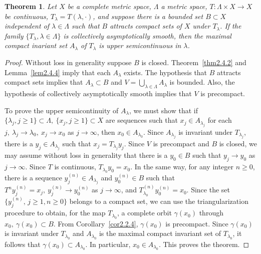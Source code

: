 \documentclass{surv-l}
\theoremstyle{plain}
\newtheorem{theorem}{Theorem}[section]
\theoremstyle{definition}
\numberwithin{equation}{section}
\numberwithin{figure}{chapter}
\begin{document}
\begin{theorem}\label{thm2.5.2} Let $X$ be a complete metric space, $\Lambda$ a metric space,
$T\!:\Lambda \times X\rightarrow X$ be continuous, $T_{\lambda}=T(\lambda, \cdot)$, and suppose there is a bounded set $B\subset X$ independent of $\lambda\in\Lambda$ such that $B$ attracts compact sets of $X$ under $T_{\lambda}$. If the family $\{T_{\lambda}, \lambda\in\Lambda\}$ is collectively asymptotically smooth, then the maximal compact inariant set $A_{\lambda}$ of $T_{\lambda}$ is upper semicontinuous in $\lambda$.
\end{theorem}

\begin{proof} Without loss in generality suppose $B$ is closed. Theorem~\ref{thm2.4.2} and Lemma~\ref{lem2.4.4} imply that each $A_{\lambda}$ exists. The hypothesis that $B$ attracts compact sets implies that $A_{\lambda}\subset B$ and $V=\bigcup_{\lambda\in\Lambda}A_{\lambda}$ is bounded. Also, the hypothesis of collectively asymptotically smooth implies that $V$ is precompact.

To prove the upper semicontinuity of $A_{\lambda}$, we must show that if $\{\lambda_{j}, j\geq 1\}\subset \Lambda,\ \{x_{j},j\geq 1\}\subset X$ are sequences such that $x_{j}\in A_{\lambda_{j}}$ for each $j,\ \lambda_{j}\rightarrow\lambda_{0},\ x_{j}\rightarrow x_{0}$ as $j\rightarrow\infty$, then $x_{0}\in A_{\lambda_{0}}$. Since $A_{\lambda_{j}}$ is invariant under $T_{\lambda_{j}}$, there is a $y_{j}\in A_{\lambda_{j}}$ such that $x_{j}=T_{\lambda_{j}}y_{j}$. Since $V$ is precompact and $B$ is closed, we may assume without loss in generality that there is a $y_{0}\in B$ such that $y_{j}\rightarrow y_{0}$ as $j\rightarrow\infty$. Since $T$ is continuous, $T_{\lambda_{0}}y_{0}=x_{0}$. In the same way, for any integer $n\geq 0$, there is a sequence $y_{j}^{(n)}\in A_{\lambda_{j}}$ and $y_{0}^{(n)}\in B$ such that $T^{n}y_{j}^{(n)}=x_{j},\ y_{j}^{(n)}\rightarrow y_{0}^{(n)}$ as $j\rightarrow\infty$, and $T_{\lambda_{0}}^{(n)}y_{0}^{(n)}=x_{0}$. Since the set $\{y_{j}^{(n)},\, j\geq 1, n\geq 0\}$ belongs to a compact set, we can use the triangularization procedure to obtain, for the map $T_{\lambda_{0}}$, a complete orbit $\gamma(x_{0})$ through $x_{0},\ \gamma(x_{0})\subset B$. From Corollary~\ref{cor2.2.4}, $\gamma(x_{0})$ is precompact. Since $\gamma(x_{0})$ is invariant under $T_{\lambda_{0}}$ and $A_{\lambda_{0}}$ is the maximal compact invariant set of $T_{\lambda_{0}}$, it follows that $\gamma(x_{0})\subset A_{\lambda_{0}}$. In particular, $x_{0}\in A_{\lambda_{0}}$. This proves the theorem.
\end{proof}
\end{document}
